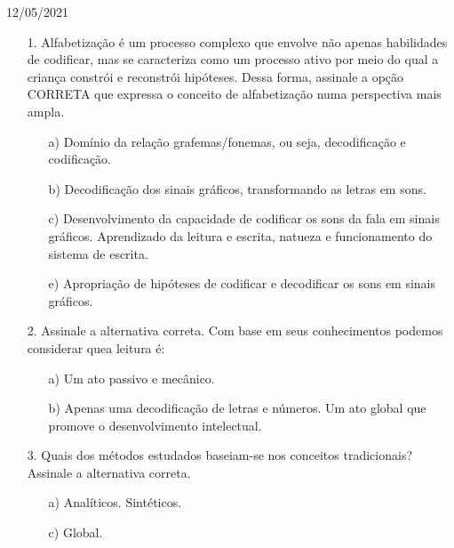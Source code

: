\documentclass{SchoolBook}
\begin{document}
    \begin{day}{12/05/2021}
        \begin{enumerate}
            \item[1.] Alfabetização é um processo complexo que envolve não apenas habilidades de codificar, mas se caracteriza como um processo ativo por meio do qual a criança constrói e reconstrói hipóteses. Dessa forma, assinale a opção CORRETA que expressa o conceito de alfabetização numa perspectiva mais ampla.
            \begin{enumerate}[nosep]
                \item[a)] Domínio da relação grafemas/fonemas, ou seja, decodificação e codificação.
                \item[b)] Decodificação dos sinais gráficos, transformando as letras em sons.
                \item[c)] Desenvolvimento da capacidade de codificar os sons da fala em sinais gráficos.
                \itemc[d)] Aprendizado da leitura e escrita, natueza e funcionamento do sistema de escrita.
                \item[e)] Apropriação de hipóteses de codificar e decodificar os sons em sinais gráficos.
            \end{enumerate}
            
            \item[2.] Assinale a alternativa correta. Com base em seus conhecimentos podemos considerar quea leitura é:
            \begin{enumerate}[nosep]
                \item[a)] Um ato passivo e mecânico.
                \item[b)] Apenas uma decodificação de letras e números.
                \itemc[c)] Um ato global que promove o desenvolvimento intelectual.
            \end{enumerate}
            
            \item[3.] Quais dos métodos estudados baseiam-se nos conceitos tradicionais? Assinale a alternativa correta.
            \begin{enumerate}[nosep]
                \item[a)] Analíticos.
                \itemc[b)] Sintéticos.
                \item[c)] Global.
            \end{enumerate}
        \end{enumerate}
    \end{day}
    
\end{document}
